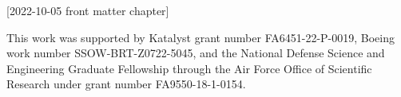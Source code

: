 [2022-10-05 front matter chapter]
%
%
%
%
%
%

%
%
%
\begin{statement}
\end{statement}




\begin{acknowledgments}
  This work was supported by Katalyst grant number FA6451-22-P-0019, Boeing work number SSOW-BRT-Z0722-5045, and the National Defense Science and Engineering Graduate Fellowship through the Air Force Office of Scientific Research under grant number FA9550-18-1-0154.
\end{acknowledgments}


